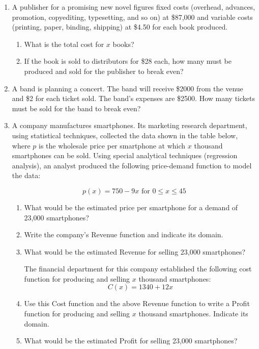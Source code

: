 \documentclass[12pt, twoside]{report}
\begin{document}
\pagebreak


\begin{enumerate}[resume]
	\item A publisher for a promising new novel figures fixed costs (overhead, advances, promotion, copyediting, typesetting, and so on) at \$87,000 and variable costs (printing, paper, binding, shipping) at \$4.50 for each book produced. 
	\begin{enumerate}
  		\item  What is the total cost for $x$ books? \vfill
  	
  		\item If the book is sold to distributors for \$28 each, how many must be produced and sold for the publisher to break even? \vfill  	
	\end{enumerate}
  
	\item A band is planning a concert. The band will receive \$2000 from the venue and \$2 for each ticket sold. The band's expenses are \$2500. How many tickets must be sold for the band to break even? \vfill
	  
	  




\pagebreak



	\item A company manufactures smartphones. Its marketing research department, using statistical techniques, collected the data shown in the table below, where $p$ is the wholesale price per smartphone at which $x$ thousand smartphones can be sold. Using special analytical techniques (regression analysis), an analyst produced the following price-demand function to model the data:
	
	$$p(x)=750-9x \textrm{ for } 0 \leq x \leq 45$$
	

	\begin{enumerate}

		\item What would be the estimated price per smartphone for a demand of 23,000 smartphones?
		\vfill


		\item Write the company's Revenue function and indicate its domain. \vfill


		\item What would be the estimated Revenue for selling 23,000 smartphones?
		\vfill

The financial department for this company established the following cost function for producing and selling $x$ thousand smartphones:
			$$C(x) = 1340+12x$$
		

		\item Use this Cost function and the above Revenue function to write a Profit function for producing and selling $x$ thousand smartphones. Indicate its domain. \vfill


		\item What would be the estimated Profit for selling 23,000 smartphones? \vfill
	\end{enumerate}
	
	
	
\end{enumerate}
	
\end{document}
